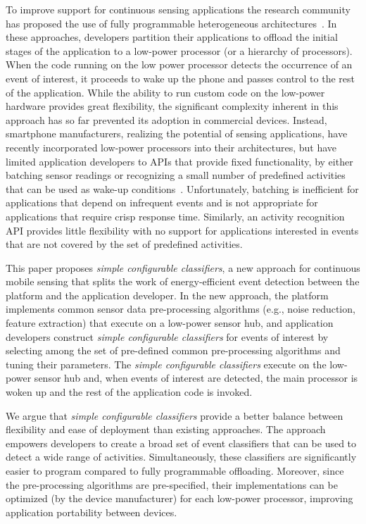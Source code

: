 To improve support for continuous sensing applications the research
community has proposed the use of fully programmable heterogeneous
architectures~\cite{reflex,littlerock,turducken}.  In these
approaches, developers partition their applications to offload the
initial stages of the application to a low-power processor (or a
hierarchy of processors).  When the code running on the low power
processor detects the occurrence of an event of interest, it proceeds
to wake up the phone and passes control to the rest of the
application.  While the ability to run custom code on the low-power
hardware provides great flexibility, the significant complexity
inherent in this approach has so far prevented its adoption in
commercial devices.  Instead, smartphone manufacturers, realizing the
potential of sensing applications, have recently incorporated
low-power processors into their architectures, but have limited
application developers to APIs that provide fixed functionality, by
either batching sensor readings or recognizing a small number of
predefined activities that can be used as wake-up
conditions~\cite{androidMotionSensors,coreMotion,motox}.
Unfortunately, batching is inefficient for applications that depend on
infrequent events and is not appropriate for applications that require
crisp response time.  Similarly, an activity recognition API provides
little flexibility with no support for applications interested in
events that are not covered by the set of predefined activities.

This paper proposes {\em simple configurable classifiers}, a new
approach for continuous mobile sensing that splits the work of
energy-efficient event detection between the platform and the
application developer.  In the new approach, the platform implements
common sensor data pre-processing algorithms (e.g., noise reduction,
feature extraction) that execute on a low-power sensor hub, and
application developers construct {\em simple configurable classifiers}
for events of interest by selecting among the set of pre-defined
common pre-processing algorithms and tuning their parameters.  The
{\em simple configurable classifiers} execute on the low-power sensor
hub and, when events of interest are detected, the main processor is
woken up and the rest of the application code is invoked.
  
We argue that {\em simple configurable classifiers} provide a better
balance between flexibility and ease of deployment than existing
approaches.  The approach empowers developers to create a broad set of
event classifiers that can be used to detect a wide range of
activities.  Simultaneously, these classifiers are significantly
easier to program compared to fully programmable offloading.
Moreover, since the pre-processing algorithms are pre-specified, their
implementations can be optimized (by the device manufacturer) for each
low-power processor, improving application portability between
devices.  

